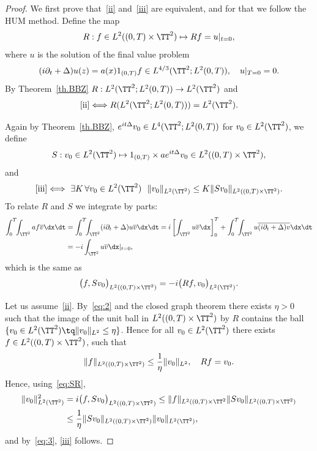\begin{proof}
We first prove that~\eqref{ii} and~\eqref{iii} are equivalent, and for that we follow the HUM method. Define the map
\[
R: f \in L^2((0,T) \times \TT^2) \mapsto R f = u |_{t=0},
\]
where $u$ is the solution of the final value problem
\[
(i \partial_t + \Delta) u (z) = a(x) 1_{(0,T)}f \in L^{4/3}(\TT^2; L^2(0,T)), \quad u |_{T=0} =0.
\]
By Theorem~\ref{th.BBZ} $ R : L^{2}(\TT^2; L^2(0,T)) \to L^2 (\TT^2) $ and
\begin{equation}\label{eq:2}
\eqref{ii}\Longleftrightarrow R (L^{2}(\TT^2; L^2(0,T))) = L^2 (\TT^2).
\end{equation}

Again by Theorem~\ref{th.BBZ}, $e^{it \Delta} v_0 \in L^4(\TT^2; L^2(0,T)) $ for $ v_0 \in L^2 (\TT^2) $, we define
\[
S: v_0 \in L^2(\TT^2) \mapsto 1_{(0,T)} \times a e^{it \Delta} v_0 \in L^2((0,T) \times \TT^2),
\]
and
\begin{equation}\label{eq:3}
\eqref{iii}\Longleftrightarrow \ \exists K \, \forall v_0 \in L^2 (\TT^2) \ \
\| v_0 \|_{L^2 (\TT^2) } \leq K\| S v_0 \|_{L^2 ((0, T) \times \TT^2)}.
\end{equation}
To relate $ R $ and $ S $ we integrate by parts:
\[
\begin{split}
\int_0^T \!\!\int_{\TT^2} af \overline {v} \dx \dt &= \int_0^T \!\!\int_{\TT^2} (i \partial_t + \Delta) u \overline {v} \dx \dt = i \left[\int_{\TT^2} u \overline{v} \dx \right] _0 ^T +\int_0^T \!\!\int_{\TT^2} u \overline {(i \partial_t + \Delta)v} \dx \dt
\\ & = -i \int_{\TT^2} u \overline{v} \dx|_{t=0},
\end{split}
\]
which is the same as
\begin{equation}\label{eq:SR}
\bigl(f, Sv_0\bigr)_{L^2((0,T)\times \TT^2)} = -i \bigl(Rf, v_0\bigr)_{L^2(\TT^2)}.
\end{equation}

Let us assume~\eqref{ii}. By~\eqref{eq:2} and the closed graph theorem there exists $\eta>0$ such that the image of the unit ball in $L^2((0,T) \times \TT^2)$ by $R$ contains the ball $ \{ v_0 \in L^2 (\TT^2) \tq \| v_0 \|_{L^2} \leq \eta \} $. Hence for all $ v_0 \in L^2 (\TT^2) $ there exists $ f \in L^2((0,T) \times \TT^2)$, such that
\[
\| f \|_{ L^2 ((0,T) \times \TT^2) } \leq \frac 1 \eta \| v_0\|_{ L^2}, \ \ \ R f = v_0.
\]
Hence, using~\eqref{eq:SR},
\begin{equation}
\begin{split}
\| v_0 \| _{L^2(\TT^2)}^2 & = i \bigl(f, Sv_0\bigr)_{L^2((0,T)\times \TT^2)} \leq \| f\|_{L^2((0,T)\times \TT^2} \| Sv_0 \|_{L^2((0,T)\times \TT^2)}
\\
& \leq \frac 1 \eta \| Sv_0 \|_{L^2((0,T)\times \TT^2)}
\| v_0 \| _{L^2(\TT^2)},
\end{split}
\end{equation}
and by~\eqref{eq:3}, {\eqref{iii}} follows.


\end{proof}
